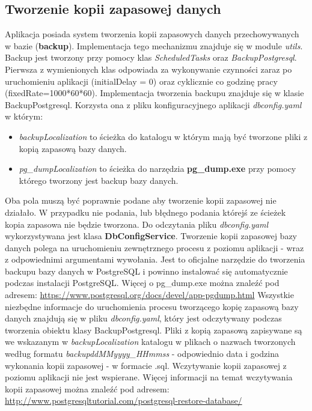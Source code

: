 \documentclass[11pt]{article}
\begin{document}
\subsection{Tworzenie kopii zapasowej danych}
Aplikacja posiada system tworzenia kopii zapasowych danych przechowywanych w bazie (\textbf{backup}). Implementacja tego mechanizmu znajduje się w module \emph{utils}. \newline
Backup jest tworzony przy pomocy klas \emph{ScheduledTasks} oraz \emph{BackupPostgresql}. Pierwsza z wymienionych klas odpowiada za wykonywanie czynności zaraz po uruchomieniu aplikacji (initialDelay = 0) oraz cyklicznie co godzinę pracy (fixedRate=1000*60*60). \newline
Implementacja tworzenia backupu znajduje się w klasie BackupPostgresql. Korzysta ona z pliku konfiguracyjnego aplikacji \emph{dbconfig.yaml} w którym: 
\begin{itemize}
\item \emph{backupLocalization} to ścieżka do katalogu w którym mają być tworzone pliki z kopią zapasową bazy danych.
\item \emph{pg\_dumpLocalization} to ścieżka do narzędzia \textbf{pg\_dump.exe} przy pomocy którego tworzony jest backup bazy danych. 
\end{itemize}
Oba pola muszą być poprawnie podane aby tworzenie kopii zapasowej nie działało. W przypadku nie podania, lub błędnego podania którejś ze ścieżek kopia zapasowa nie będzie tworzona. Do odczytania pliku \emph{dbconfig.yaml} wykorzystywana jest klasa \textbf{DbConfigService}. \newline
Tworzenie kopii zapasowej bazy danych polega na uruchomieniu zewnętrznego procesu z poziomu aplikacji -  wraz z odpowiednimi argumentami wywołania. Jest to oficjalne narzędzie do tworzenia backupu bazy danych w PostgreSQL i  powinno instalować się automatycznie podczas instalacji PostgreSQL. Więcej o pg\_dump.exe można znaleźć pod adresem: \url{https://www.postgresql.org/docs/devel/app-pgdump.html} \newline 
Wszystkie niezbędne informacje do uruchomienia procesu tworzącego kopię zapasową bazy danych znajdują się w pliku \emph{dbconfig.yaml}, który jest odczytywany podczas tworzenia obiektu klasy BackupPostgresql. Pliki z kopią zapasową zapisywane są we wskazanym w \emph{backupLocalization} katalogu w plikach o nazwach tworzonych według formatu \emph{backupddMMyyyy\_HHmmss} - odpowiednio data i godzina wykonania kopii zapasowej - w formacie .sql. Wczytywanie kopii zapasowej z poziomu aplikacji nie jest wspierane. Więcej informacji na temat wczytywania kopii zapasowej można znaleźć pod adresem: \url{http://www.postgresqltutorial.com/postgresql-restore-database/}
\end{document}
